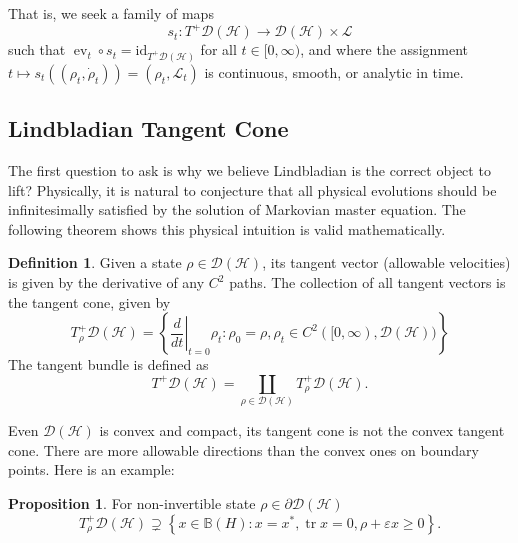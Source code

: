 \documentclass[11pt,reqno]{amsart}
\theoremstyle{definition}
\newtheorem{proposition}[theorem]{Proposition}
\newtheorem{definition}[theorem]{Definition}
\newcommand{\mb}{\mathbb}
\newcommand{\mc}{\mathcal}
\newcommand{\lset}{\left\{ }
\newcommand{\rset}{\right\} }
\DeclareMathOperator{\tr}{tr}
\DeclareMathOperator{\ev}{ev}
\begin{document}
That is, we seek a family of maps
\[
s_t : T^+\mc D(\mc{H}) \to \mc D(\mc{H}) \times \mc L
\]
such that $\ev_t \circ s_t = \mathrm{id}_{T^+\mc D(\mc{H})}$ for all $t\in [0,\infty)$, and where the assignment 
$t \mapsto s_t((\rho_t, \dot{\rho}_t)) = (\rho_t, \mc{L}_t)$ 
is continuous, smooth, or analytic in time.

\subsection{Lindbladian Tangent Cone}
The first question to ask is why we believe Lindbladian is the correct object to lift? Physically, it is natural to conjecture that all physical evolutions should be infinitesimally satisfied by the solution of Markovian master equation. The following theorem shows this physical intuition is valid mathematically.
\begin{definition}
    Given a state $\rho\in\mc D(\mc{H})$, its tangent vector (allowable velocities) is given by the derivative of any $C^2$ paths. 
    The collection of all tangent vectors is the tangent cone, given by 
    $$T_\rho^+\mc D(\mc H)=\lset \left.\dfrac{d}{dt}\right|_{t=0}\rho_t: \rho_0=\rho, \rho_t\in C^2([0,\infty), \mc D(\mc H))\rset$$
    The tangent bundle is defined as 
    $$T^+\mc D(\mc H)=\coprod_{\rho\in\mc D(\mc H)}T^+_\rho\mc D(\mc H).$$
\end{definition}
Even $\mc D(\mc H)$ is convex and compact, its tangent cone is not the convex tangent cone. There are more allowable directions than the convex ones on boundary points. Here is an example:
\begin{proposition}  \label{nonconv} For non-invertible state $\rho \in \partial \mc D(\mc{H})$
    $$T^+_\rho \mc D(\mc{H})\supsetneq \lset x\in\mb B(H): x=x^*, \tr x=0, \rho+\varepsilon x\geq 0\rset.$$
\end{proposition}
\end{document}

